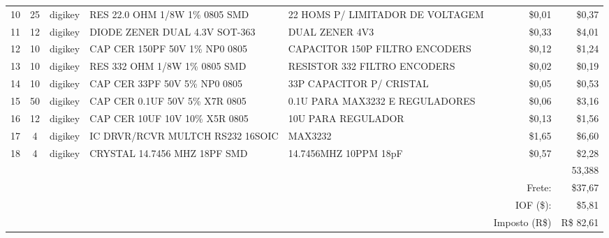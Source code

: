 \begin{table}[!h]
\begin{tabular}{crrrrrr}
    10    & \multicolumn{1}{c}{25} & \multicolumn{1}{c}{digikey} & \multicolumn{1}{l}{RES 22.0 OHM 1/8W 1\% 0805 SMD} & \multicolumn{1}{l}{22 HOMS P/ LIMITADOR DE VOLTAGEM} & \$0,01 & \$0,37 \\
    11    & \multicolumn{1}{c}{12} & \multicolumn{1}{c}{digikey} & \multicolumn{1}{l}{DIODE ZENER DUAL 4.3V SOT-363} & \multicolumn{1}{l}{DUAL ZENER 4V3} & \$0,33 & \$4,01 \\
    12    & \multicolumn{1}{c}{10} & \multicolumn{1}{c}{digikey} & \multicolumn{1}{l}{CAP CER 150PF 50V 1\% NP0 0805} & \multicolumn{1}{l}{CAPACITOR 150P FILTRO ENCODERS} & \$0,12 & \$1,24 \\
    13    & \multicolumn{1}{c}{10} & \multicolumn{1}{c}{digikey} & \multicolumn{1}{l}{RES 332 OHM 1/8W 1\% 0805 SMD} & \multicolumn{1}{l}{RESISTOR 332 FILTRO ENCODERS} & \$0,02 & \$0,19 \\
    14    & \multicolumn{1}{c}{10} & \multicolumn{1}{c}{digikey} & \multicolumn{1}{l}{CAP CER 33PF 50V 5\% NP0 0805} & \multicolumn{1}{l}{33P CAPACITOR P/ CRISTAL} & \$0,05 & \$0,53 \\
    15    & \multicolumn{1}{c}{50} & \multicolumn{1}{c}{digikey} & \multicolumn{1}{l}{CAP CER 0.1UF 50V 5\% X7R 0805} & \multicolumn{1}{l}{0.1U PARA MAX3232 E REGULADORES} & \$0,06 & \$3,16 \\
    16    & \multicolumn{1}{c}{12} & \multicolumn{1}{c}{digikey} & \multicolumn{1}{l}{CAP CER 10UF 10V 10\% X5R 0805} & \multicolumn{1}{l}{10U PARA REGULADOR} & \$0,13 & \$1,56 \\
    17    & \multicolumn{1}{c}{4} & \multicolumn{1}{c}{digikey} & \multicolumn{1}{l}{IC DRVR/RCVR MULTCH RS232 16SOIC} & \multicolumn{1}{l}{MAX3232} & \$1,65 & \$6,60 \\
    18    & \multicolumn{1}{c}{4} & \multicolumn{1}{c}{digikey} & \multicolumn{1}{l}{CRYSTAL 14.7456 MHZ 18PF SMD} & \multicolumn{1}{l}{14.7456MHZ 10PPM 18pF} & \$0,57 & \$2,28 \\
          &       & \multicolumn{1}{c}{} & \multicolumn{1}{l}{} & \multicolumn{1}{l}{} &       & 53,388 \\
          &       & \multicolumn{1}{c}{} & \multicolumn{1}{l}{} & \multicolumn{1}{l}{} & Frete: & \$37,67 \\
          &       & \multicolumn{1}{c}{} & \multicolumn{1}{l}{} & \multicolumn{1}{l}{} & IOF (\$): & \$5,81 \\
          &       & \multicolumn{1}{c}{} & \multicolumn{1}{l}{} & \multicolumn{1}{l}{} & Imposto (R\$) & R\$ 82,61 \\

\end{tabular}
\end{table}
